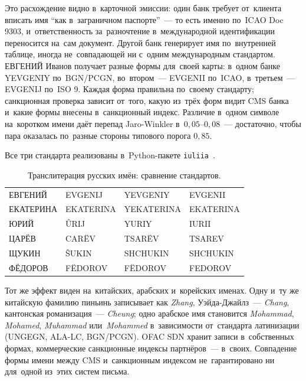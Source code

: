 Это расхождение видно в~карточной эмиссии: один банк требует от~клиента вписать
имя \enquote{как в~заграничном паспорте}~--- то есть именно по~ICAO Doc 9303,
и~ответственность за~разночтение в~международной идентификации переносится
на~сам документ. Другой банк генерирует имя по~внутренней таблице, иногда
не~совпадающей ни с~одним международным стандартом. ЕВГЕНИЙ Иванов получает
разные формы для~своей карты: в~одном банке YEVGENIY по~BGN/PCGN,
во~втором~--- EVGENII по~ICAO, в~третьем~--- EVGENIJ по~ISO 9. Каждая форма
правильна по~своему стандарту; санкционная проверка зависит от~того, какую
из~трёх форм видит CMS банка и~какие формы внесены в~санкционный индекс. Различие
в~одном символе на~коротком имени даёт перепад Jaro-Winkler в~$0{,}05$--$0{,}08$~--- достаточно, чтобы пара
оказалась по~разные стороны типового порога $0{,}85$.

Все три стандарта реализованы в~Python-пакете \texttt{iuliia}~\cite{iuliia}.

\begin{table}[t]
  \caption{Транслитерация русских имён: сравнение стандартов.}\label{tab:sanctions-translit}
  \begingroup
  \tablesetup
  \setlength{\tabcolsep}{6pt}
  \begin{tabularx}{\textwidth}{
      @{}B{0.20\textwidth} Y Y Y@{}
    }
    \toprule
    \headrow
     &  &  &  \\
    \midrule
    ЕВГЕНИЙ    & EVGENIJ    & YEVGENIY    & EVGENII \\
    \rowsep
    ЕКАТЕРИНА  & EKATERINA  & YEKATERINA  & EKATERINA \\
    \rowsep
    ЮРИЙ       & ÛRIJ       & YURIY       & IURII \\
    \rowsep
    ЦАРЁВ      & CARËV      & TSARËV      & TSAREV \\
    \rowsep
    ЩУКИН      & ŜUKIN      & SHCHUKIN    & SHCHUKIN \\
    \rowsep
    ФЁДОРОВ    & FËDOROV    & FËDOROV     & FEDOROV \\
    \bottomrule
  \end{tabularx}\par
  \endgroup
\end{table}

Тот же эффект виден на~китайских, арабских и~корейских именах. Одну и~ту же
китайскую фамилию пиньинь записывает как \textit{Zhang}, Уэйда-Джайлз~---
\textit{Chang}, кантонская романизация~--- \textit{Cheung}; одно арабское имя
становится \textit{Mohammad}, \textit{Mohamed}, \textit{Muhammad} или~\textit{Mohammed}
в~зависимости от~стандарта латинизации (UNGEGN, ALA-LC, BGN/PCGN). OFAC SDN хранит
записи в~собственных формах, коммерческие санкционные индексы партнёров~--- в~своих.
Совпадение формы имени между CMS и~санкционным индексом не~гарантировано ни
для~одной из~этих систем письма.

